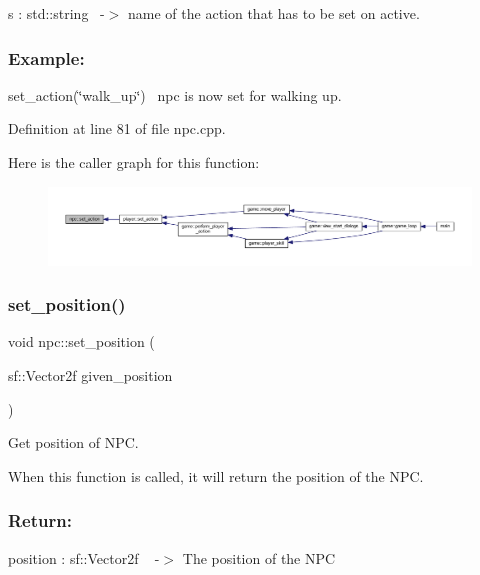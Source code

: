 s \+: std\+::string~\newline
-\/$>$ name of the action that has to be set on active.

\subsubsection*{Example\+: }

set\+\_\+action(\char`\"{}walk\+\_\+up\char`\"{})~\newline
npc is now set for walking up.~\newline


Definition at line 81 of file npc.\+cpp.

Here is the caller graph for this function\+:
\nopagebreak
\begin{figure}[H]
\begin{center}
\leavevmode
\includegraphics[width=350pt]{classnpc_aa86a880284a09f9fc3358a61a74be1b9_icgraph}
\end{center}
\end{figure}
\mbox{\label{classnpc_a52d22585e441af4d8dde1d1a2658b2dc}} 
\subsubsection{\texorpdfstring{set\+\_\+position()}{set\_position()}}
{\footnotesize\ttfamily void npc\+::set\+\_\+position (\begin{DoxyParamCaption}\item[{sf\+::\+Vector2f}]{given\+\_\+position }\end{DoxyParamCaption})}



Get position of N\+PC. 

When this function is called, it will return the position of the N\+PC.~\newline
 \subsubsection*{Return\+: }

position \+: sf\+::\+Vector2f ~\newline
-\/$>$ The position of the N\+PC

